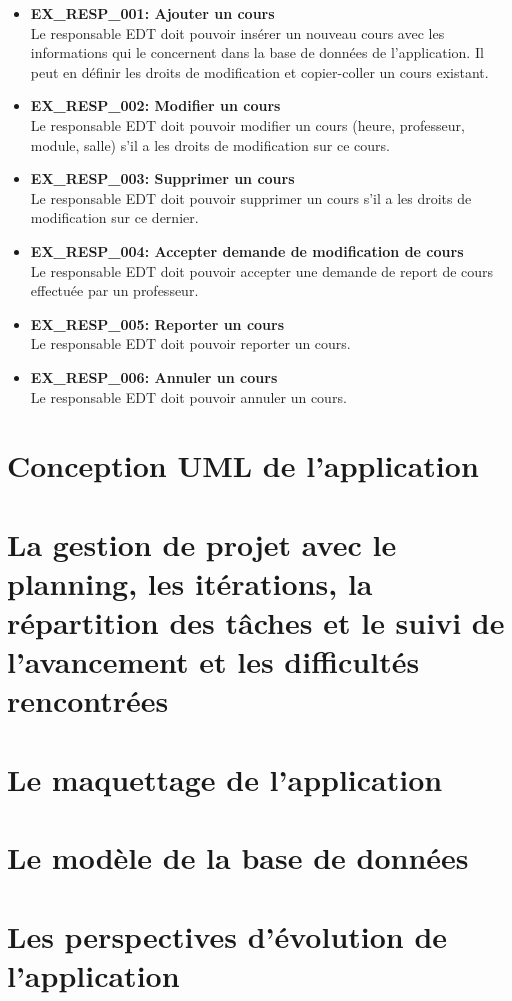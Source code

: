 \documentclass[a4paper,12pt]{article}
\begin{document}
\begin{itemize}
    \item \textbf{EX\_RESP\_001: Ajouter un cours} \\
    Le responsable EDT doit pouvoir insérer un nouveau cours avec les informations qui le concernent dans la base de données de l'application. Il peut en définir les droits de modification et copier-coller un cours existant.

    \item \textbf{EX\_RESP\_002: Modifier un cours} \\
    Le responsable EDT doit pouvoir modifier un cours (heure, professeur, module, salle) s'il a les droits de modification sur ce cours.

    \item \textbf{EX\_RESP\_003: Supprimer un cours} \\
    Le responsable EDT doit pouvoir supprimer un cours s'il a les droits de modification sur ce dernier.

    \item \textbf{EX\_RESP\_004: Accepter demande de modification de cours} \\
    Le responsable EDT doit pouvoir accepter une demande de report de cours effectuée par un professeur.

    \item \textbf{EX\_RESP\_005: Reporter un cours} \\
    Le responsable EDT doit pouvoir reporter un cours.

    \item \textbf{EX\_RESP\_006: Annuler un cours} \\
    Le responsable EDT doit pouvoir annuler un cours.
\end{itemize}

\section{Conception UML de l’application}


\section{La gestion de projet avec le planning, les itérations, la répartition des tâches et le suivi de l’avancement et les difficultés rencontrées}
\section{Le maquettage de l’application}
\section{Le modèle de la base de données}
\section{Les perspectives d’évolution de l’application}
\end{document}
